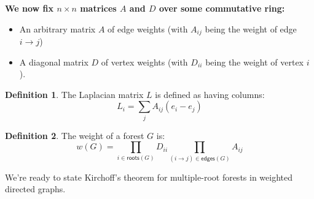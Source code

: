 \documentclass[a4paper, 11pt]{article}
\theoremstyle{definition}
\newtheorem{definition}{Definition}[section]
\begin{document}
\textbf{We now fix $n\times n$ matrices $A$ and $D$ over some commutative ring:}

\begin{itemize}
  \item An arbitrary matrix $A$ of edge weights (with $A_{ij}$ being the weight of edge $i \to j$)
  \item A diagonal matrix $D$ of vertex weights (with $D_{ii}$ being the weight of vertex $i$).
\end{itemize}

\begin{definition}
  \label{def:laplacian}
  The Laplacian matrix $L$ is defined as having columns:
  \[ L_i = \sum_j A_{ij}(e_i - e_j) \]
\end{definition}

\begin{definition}
  The weight of a forest $G$ is:
  \[w(G) = \prod_{i \in \mathsf{roots}(G)} D_{ii} \prod_{(i \to j) \in \mathsf{edges}(G)} A_{ij} \]
\end{definition}

\medskip
We're ready to state Kirchoff's theorem for multiple-root forests in weighted directed graphs.
\end{document}
